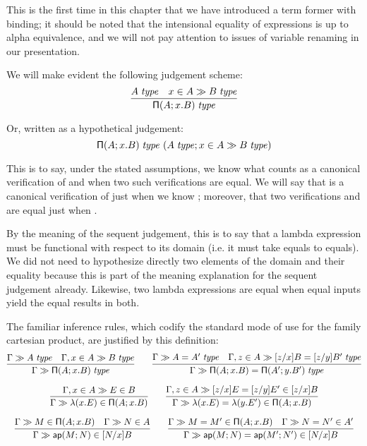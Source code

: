\documentclass[main.tex]{subfiles}
\begin{document}
This is the first time in this chapter that we have introduced a term former
with binding; it should be noted that the intensional equality of expressions
is up to alpha equivalence, and we will not pay attention to issues of variable
renaming in our presentation.

We will make evident the following judgement scheme:
\[
  \infer{
    \isset{\typrod{A}{x}{B}}
  }{
    \isset{A} &
    \sequent{\ver{x}{A}}{\isset{B}}
  }
\]

Or, written as a hypothetical judgement:
\[
  \mathsf{\Pi}(A;x.B)\;\mathit{type}\ (A\;\mathit{type};x\in A\gg B\;\mathit{type})
\]

This is to say, under the stated assumptions, we know what counts as a
canonical verification of  and when two such verifications are
equal. We will say that  is a canonical verification of
 just when we know ; moreover,
that two verifications  and  are equal just when
.

By the meaning of the sequent judgement, this is to say that a lambda
expression must be functional with respect to its domain (i.e. it must take
equals to equals). We did not need to hypothesize directly two elements of the
domain and their equality because this is part of the meaning explanation for
the sequent judgement already. Likewise, two lambda expressions are equal when
equal inputs yield the equal results in both.

The familiar inference rules, which codify the standard mode of use for the
family cartesian product, are justified by this definition:
\begin{gather*}
  \infer{
    \sequent\Gamma\isset{\typrod{A}{x}{B}}
  }{
    \sequent\Gamma\isset{A} &
    \sequent{\Gamma,\ver{x}{A}}{\isset{B}}
  }\qquad
  \infer{
    \sequent\Gamma\isset{\typrod{A}{x}{B}=\typrod{A'}{y}{B'}}
  }{
   \sequent\Gamma\isset{A=A'} &
    \sequent{\Gamma,\ver{z}{A}}{\isset{[z/x]B=[z/y]B'}}
  }\\[6pt]
  \infer{
    \sequent\Gamma\ver{\lam{x}{E}}{\typrod{A}{x}{B}}
  }{
    \sequent{\Gamma,\ver{x}{A}}{\ver{E}{B}}
  }\qquad
  \infer{
    \sequent\Gamma\ver{\lam{x}{E}=\lam{y}{E'}}{\typrod{A}{x}{B}}
  }{
    \sequent{\Gamma,\ver{z}{A}}{\ver{[z/x]E=[z/y]E'}{[z/x]B}}
  }\\[6pt]
  \infer{
    \sequent\Gamma\ver{\ap{M}{N}}{[N/x]B}
  }{
    \sequent\Gamma\ver{M}{\typrod{A}{x}{B}} &
    \sequent\Gamma\ver{N}{A}
  }\qquad
  \infer{
    \sequent\Gamma\ver{\ap{M}{N}=\ap{M'}{N'}}{[N/x]B}
  }{
    \sequent\Gamma\ver{M=M'}{\typrod{A}{x}{B}} &
    \sequent\Gamma\ver{N=N'}{A'}
  }
\end{gather*}
\end{document}
